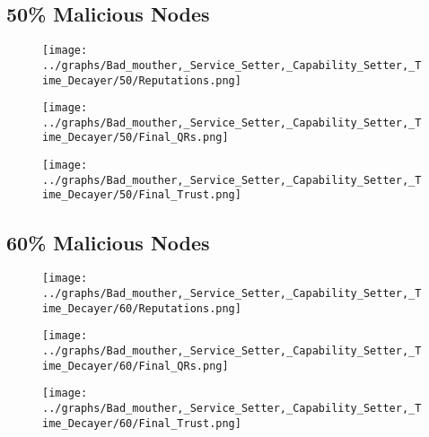 \documentclass{article}
\begin{document}
  \begin{minipage}[t]{0.49\columnwidth}
    \subsection*{50\% Malicious Nodes}
        \begin{figure}[H]
            \centering
            \texttt{[image: ../graphs/Bad\_mouther,\_Service\_Setter,\_Capability\_Setter,\_Time\_Decayer/50/Reputations.png]}
        \end{figure}
        \begin{figure}[H]
            \centering
            \texttt{[image: ../graphs/Bad\_mouther,\_Service\_Setter,\_Capability\_Setter,\_Time\_Decayer/50/Final\_QRs.png]}
        \end{figure}
    \end{minipage}
    \begin{minipage}[t]{0.49\columnwidth}
        \begin{figure}[H]
            \centering
            \texttt{[image: ../graphs/Bad\_mouther,\_Service\_Setter,\_Capability\_Setter,\_Time\_Decayer/50/Final\_Trust.png]}
        \end{figure}
    \end{minipage}

  \begin{minipage}[t]{0.49\columnwidth}
    \subsection*{60\% Malicious Nodes}
        \begin{figure}[H]
            \centering
            \texttt{[image: ../graphs/Bad\_mouther,\_Service\_Setter,\_Capability\_Setter,\_Time\_Decayer/60/Reputations.png]}
        \end{figure}
        \begin{figure}[H]
            \centering
            \texttt{[image: ../graphs/Bad\_mouther,\_Service\_Setter,\_Capability\_Setter,\_Time\_Decayer/60/Final\_QRs.png]}
        \end{figure}
    \end{minipage}
    \begin{minipage}[t]{0.49\columnwidth}
        \begin{figure}[H]
            \centering
            \texttt{[image: ../graphs/Bad\_mouther,\_Service\_Setter,\_Capability\_Setter,\_Time\_Decayer/60/Final\_Trust.png]}
        \end{figure}
    \end{minipage}
\end{document}
